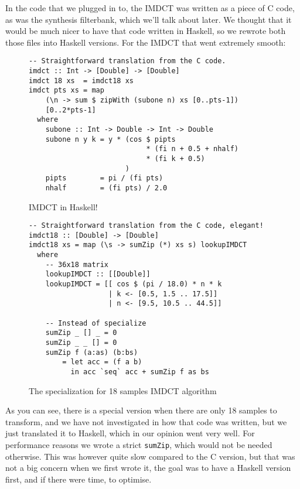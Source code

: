 \documentclass[a4paper,12pt]{article}
\begin{document}
        In the code that we plugged in to, the IMDCT was written as a piece of C
        code, as was the synthesis filterbank, which we'll talk about later. We
        thought that it would be much nicer to have that code written in
        Haskell, so we rewrote both those files into Haskell versions. For the
        IMDCT that went extremely smooth:
\begin{figure}[H]
  \begin{center}
        \begin{lstlisting}
-- Straightforward translation from the C code.
imdct :: Int -> [Double] -> [Double]
imdct 18 xs  = imdct18 xs
imdct pts xs = map
    (\n -> sum $ zipWith (subone n) xs [0..pts-1])
    [0..2*pts-1]
  where
    subone :: Int -> Double -> Int -> Double
    subone n y k = y * (cos $ pipts
                            * (fi n + 0.5 + nhalf)
                            * (fi k + 0.5)
                       )
    pipts        = pi / (fi pts)
    nhalf        = (fi pts) / 2.0
        \end{lstlisting}
    \caption{IMDCT in Haskell!}\label{fig:imdcthaskell}
  \end{center}
\end{figure}

\begin{figure}[H]
  \begin{center}
        \begin{lstlisting}
-- Straightforward translation from the C code, elegant!
imdct18 :: [Double] -> [Double]
imdct18 xs = map (\s -> sumZip (*) xs s) lookupIMDCT
  where
    -- 36x18 matrix
    lookupIMDCT :: [[Double]]
    lookupIMDCT = [[ cos $ (pi / 18.0) * n * k
                   | k <- [0.5, 1.5 .. 17.5]]
                   | n <- [9.5, 10.5 .. 44.5]]

    -- Instead of specialize
    sumZip _ [] _ = 0
    sumZip _ _ [] = 0
    sumZip f (a:as) (b:bs)
        = let acc = (f a b)
          in acc `seq` acc + sumZip f as bs
        \end{lstlisting}
    \caption{The specialization for 18 samples IMDCT algorithm}\label{fig:imdctimpl36}
  \end{center}
\end{figure}

        As you can see, there is a special version when there are only 18
        samples to transform, and we have not investigated in how that code was
        written, but we just translated it to Haskell, which in our opinion went
        very well. For performance reasons we wrote a strict \texttt{sumZip}, which would
        not be needed otherwise. This was however quite slow compared to the C
        version, but that was not a big concern when we first wrote it, the goal
        was to have a Haskell version first, and if there were time, to
        optimise. \\
\end{document}
